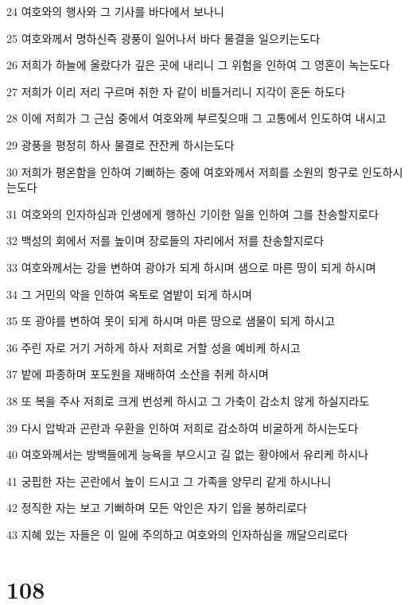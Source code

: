 \par 24 여호와의 행사와 그 기사를 바다에서 보나니
\par 25 여호와께서 명하신즉 광풍이 일어나서 바다 물결을 일으키는도다
\par 26 저희가 하늘에 올랐다가 깊은 곳에 내리니 그 위험을 인하여 그 영혼이 녹는도다
\par 27 저희가 이리 저리 구르며 취한 자 같이 비틀거리니 지각이 혼돈 하도다
\par 28 이에 저희가 그 근심 중에서 여호와께 부르짖으매 그 고통에서 인도하여 내시고
\par 29 광풍을 평정히 하사 물결로 잔잔케 하시는도다
\par 30 저희가 평온함을 인하여 기뻐하는 중에 여호와께서 저희를 소원의 항구로 인도하시는도다
\par 31 여호와의 인자하심과 인생에게 행하신 기이한 일을 인하여 그를 찬송할지로다
\par 32 백성의 회에서 저를 높이며 장로들의 자리에서 저를 찬송할지로다
\par 33 여호와께서는 강을 변하여 광야가 되게 하시며 샘으로 마른 땅이 되게 하시며
\par 34 그 거민의 악을 인하여 옥토로 염밭이 되게 하시며
\par 35 또 광야를 변하여 못이 되게 하시며 마른 땅으로 샘물이 되게 하시고
\par 36 주린 자로 거기 거하게 하사 저희로 거할 성을 예비케 하시고
\par 37 밭에 파종하며 포도원을 재배하여 소산을 취케 하시며
\par 38 또 복을 주사 저희로 크게 번성케 하시고 그 가축이 감소치 않게 하실지라도
\par 39 다시 압박과 곤란과 우환을 인하여 저희로 감소하여 비굴하게 하시는도다
\par 40 여호와께서는 방백들에게 능욕을 부으시고 길 없는 황야에서 유리케 하시나
\par 41 궁핍한 자는 곤란에서 높이 드시고 그 가족을 양무리 같게 하시나니
\par 42 정직한 자는 보고 기뻐하며 모든 악인은 자기 입을 봉하리로다
\par 43 지혜 있는 자들은 이 일에 주의하고 여호와의 인자하심을 깨달으리로다

\chapter{108}

